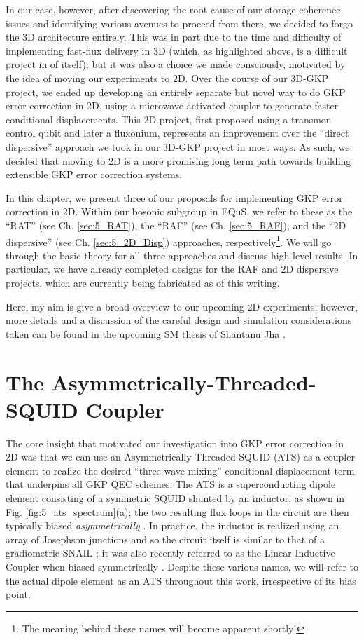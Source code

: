 In our case, however, after discovering the root cause of our storage coherence issues and identifying various avenues to proceed from there, we decided to forgo the 3D architecture entirely. This was in part due to the time and difficulty of implementing fast-flux delivery in 3D (which, as highlighted above, is a difficult project in of itself); but it was also a choice we made consciously, motivated by the idea of moving our experiments to 2D. Over the course of our 3D-GKP project, we ended up developing an entirely separate but novel way to do GKP error correction in 2D, using a microwave-activated coupler to generate faster conditional displacements. This 2D project, first proposed using a transmon control qubit and later a fluxonium, represents an improvement over the ``direct dispersive'' approach we took in our 3D-GKP project in most ways. As such, we decided that moving to 2D is a more promising long term path towards building extensible GKP error correction systems. 

In this chapter, we present three of our proposals for implementing GKP error correction in 2D. Within our bosonic subgroup in EQuS, we refer to these as the ``RAT'' (see Ch. \ref{sec:5_RAT}), the ``RAF'' (see Ch. \ref{sec:5_RAF}), and the ``2D dispersive'' (see Ch. \ref{sec:5_2D_Disp}) approaches, respectively\footnote{The meaning behind these names will become apparent shortly!}. We will go through the basic theory for all three approaches and discuss high-level results. In particular, we have already completed designs for the RAF and 2D dispersive projects, which are currently being fabricated as of this writing. 

Here, my aim is give a broad overview to our upcoming 2D experiments; however, more details and a discussion of the careful design and simulation considerations taken can be found in the upcoming SM thesis of Shantanu Jha \cite{shantanu2024thesis}. 
\clearpage


\section{The Asymmetrically-Threaded-SQUID Coupler \label{sec:5_RAT}}

The core insight that motivated our investigation into GKP error correction in 2D was that we can use an Asymmetrically-Threaded SQUID (ATS) as a coupler element to realize the desired ``three-wave mixing'' conditional displacement term that underpins all GKP QEC schemes. The ATS is a superconducting dipole element consisting of a symmetric SQUID shunted by an inductor, as shown in Fig. \ref{fig:5_ats_spectrum}(a); the two resulting flux loops in the circuit are then typically biased \textit{asymmetrically} \cite{lescanne2020exponential, berdou2023one}. In practice, the inductor is realized using an array of Josephson junctions and so the circuit itself is similar to that of a gradiometric SNAIL \cite{miano2022frequency}; it was also recently referred to as the Linear Inductive Coupler when biased symmetrically \cite{maiti2024ancilla}. Despite these various names, we will refer to the actual dipole element as an ATS throughout this work, irrespective of its bias point. 


